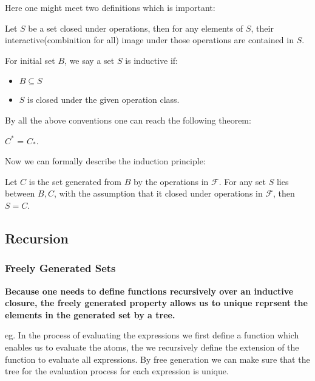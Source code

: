\documentclass[11pt]{article}
\begin{document}
Here one might meet two definitions which is important:

\begin{definition}
Let \(S\) be a set closed under operations, then for any elements of \(S\), their interactive(combinition for all) image under those operations are contained in \(S\).
\end{definition}

\begin{definition}
For initial set \(B\), we say a set \(S\) is inductive if:
\begin{itemize}
\item \(B \subseteq S\)
\item \(S\) is closed under the given operation class.
\end{itemize}
\end{definition}

By all the above conventions one can reach the following theorem:

\begin{theorem}[ ]
\(C^{\ast}\) = \(C_{\ast}\).
\end{theorem}

Now we can formally describe the induction principle:

\begin{theorem}
Let \(C\) is the set generated from \(B\) by the operations in \(\mathcal{F}\). For any set \(S\) lies between \(B,C\), with the assumption that it closed under operations in \(\mathcal{F}\), then \(S = C\).
\end{theorem}
\subsection{Recursion}
\label{sec:org6162214}
\subsubsection{Freely Generated Sets}
\label{sec:org8685b4b}
\textbf{Because one needs to define functions recursively over an inductive closure, the freely generated property allows us to unique reprsent the elements in the generated set by a tree.}

eg. In the process of evaluating the expressions we first define a function which enables us to evaluate the atoms, the we recursively define the extension of the function to evaluate all expressions. By free generation we can make sure that the tree for the evaluation process for each expression is unique.
\end{document}
